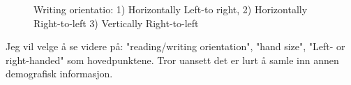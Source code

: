   \begin{figure}[H]
    \centering
    \caption{Writing orientatio: 1) Horizontally Left-to right, 2) Horizontally Right-to-left 3) Vertically Right-to-left}
  \end{figure}

  {\color{red} Jeg vil velge å se videre på: "reading/writing orientation", "hand size", "Left- or right-handed" som hovedpunktene. Tror uansett det er lurt å samle inn annen demografisk informasjon.} 


